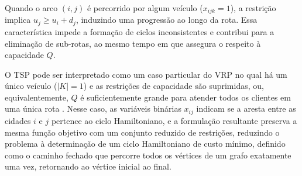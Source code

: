 
Quando o arco $(i,j)$ é percorrido por algum veículo ($x_{ijk} = 1$), a restrição implica $u_j \geq u_i + d_j$, induzindo uma progressão ao longo da rota. Essa característica impede a formação de ciclos inconsistentes e contribui para a eliminação de sub-rotas, ao mesmo tempo em que assegura o respeito à capacidade $Q$.

O TSP pode ser interpretado como um caso particular do VRP no qual há um único veículo ($|K| = 1$) \cite{toth2002vehicle} e as restrições de capacidade são suprimidas, ou, equivalentemente, $Q$ é suficientemente grande para atender todos os clientes em uma única rota \cite{balinski1964integer, eilon1974distribution}. Nesse caso, as variáveis binárias $x_{ij}$ indicam se a aresta entre as cidades $i$ e $j$ pertence ao ciclo Hamiltoniano, e a formulação resultante preserva a mesma função objetivo com um conjunto reduzido de restrições, reduzindo o problema à determinação de um ciclo Hamiltoniano de custo mínimo, definido como o caminho fechado que percorre todos os vértices de um grafo exatamente uma vez, retornando ao vértice inicial ao final.




